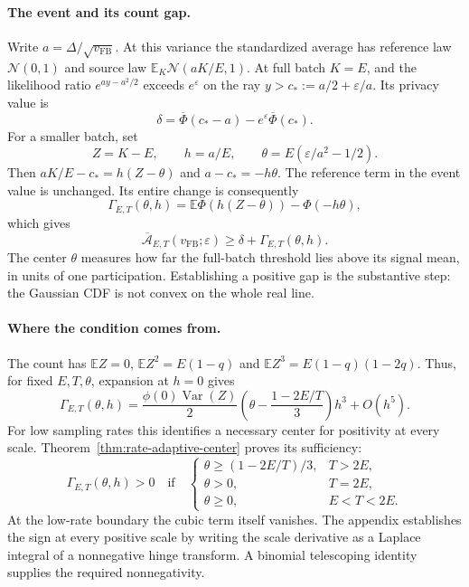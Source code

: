 \documentclass[11pt]{article}
\theoremstyle{remark}
\newcommand{\E}{\mathbb E}
\newcommand{\Normal}{\mathcal N}
\begin{document}
\paragraph{The event and its count gap.}
Write $a=\Delta/\sqrt{v_{\mathrm{FB}}}$. At this variance the standardized
average has reference law $\Normal(0,1)$ and source law
$\E_K\Normal(aK/E,1)$. At full batch $K=E$, and the likelihood ratio
$e^{ay-a^2/2}$ exceeds $e^\varepsilon$ on the ray
$y>c_*:=a/2+\varepsilon/a$. Its privacy value is
\begin{equation}\label{eq:fullbatch-event-identity}
 \delta=\overline\Phi(c_*-a)-e^\varepsilon\overline\Phi(c_*).
\end{equation}
For a smaller batch, set
\[
 Z=K-E,\qquad h=a/E,\qquad
 \theta=E(\varepsilon/a^2-1/2).
\]
Then $aK/E-c_*=h(Z-\theta)$ and $a-c_*=-h\theta$. The reference term
in the event value is unchanged. Its entire change is consequently
\begin{equation}\label{eq:main-count-gap}
 \Gamma_{E,T}(\theta,h)=\E\Phi(h(Z-\theta))-\Phi(-h\theta),
\end{equation}
which gives
\begin{equation}\label{eq:event-profile-bound}
 \overline{\mathcal A}_{E,T}(v_{\mathrm{FB}};\varepsilon)
 \geq\delta+\Gamma_{E,T}(\theta,h).
\end{equation}
The center $\theta$ measures how far the full-batch threshold lies above its
signal mean, in units of one participation. Establishing a positive gap is
the substantive step: the Gaussian CDF is not convex on the whole real line.

\paragraph{Where the condition comes from.}
The count has $\E Z=0$, $\E Z^2=E(1-q)$ and
$\E Z^3=E(1-q)(1-2q)$. Thus, for fixed $E,T,\theta$, expansion at $h=0$ gives
\begin{equation}\label{eq:gap-small-scale}
 \Gamma_{E,T}(\theta,h)
 =\frac{\phi(0)\operatorname{Var}(Z)}2
   \left(\theta-\frac{1-2E/T}{3}\right)h^3+O(h^5).
\end{equation}
For low sampling rates this identifies a necessary center for positivity
at every scale. Theorem~\ref{thm:rate-adaptive-center} proves its sufficiency:
\[
 \Gamma_{E,T}(\theta,h)>0\quad\text{if}\quad
 \begin{cases}
 \theta\geq(1-2E/T)/3,&T>2E,\\
 \theta>0,&T=2E,\\
 \theta\geq0,&E<T<2E.
 \end{cases}
\]
At the low-rate boundary the cubic term itself vanishes. The appendix
establishes the sign at every positive scale by writing the scale derivative
as a Laplace integral of a nonnegative hinge transform. A binomial telescoping
identity supplies the required nonnegativity.
\end{document}
